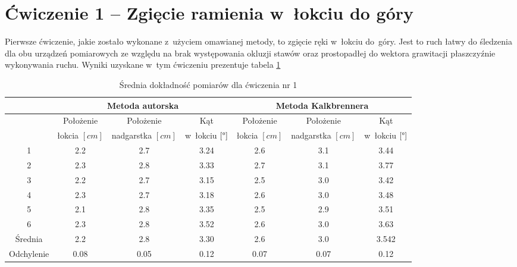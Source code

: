 \section*{Ćwiczenie 1 -- Zgięcie ramienia w~łokciu do góry}
Pierwsze ćwiczenie, jakie zostało wykonane z~użyciem omawianej metody, to zgięcie ręki w~łokciu do~góry. Jest to ruch łatwy do śledzenia dla obu urządzeń pomiarowych ze względu na brak występowania okluzji stawów oraz prostopadłej do wektora grawitacji płaszczyźnie wykonywania ruchu. Wyniki uzyskane w~tym ćwiczeniu prezentuje tabela \ref{tab:experiments:first:avg}
\begin{table}[!htp]
	\caption{Średnia dokładność pomiarów dla ćwiczenia nr 1}
	\label{tab:experiments:first:avg}
	\noindent
	\tiny
	\centering
	\begin{tabular}{|c|c|c|c|c|c|c|}
		\hline 
		& \multicolumn{3}{c|}{Metoda autorska} & \multicolumn{3}{c|}{Metoda Kalkbrennera}  \\ 
		\hline 
		           & Położenie    & Położenie       & Kąt                  & Położenie    & Położenie       & Kąt                  \\
		           & łokcia $[cm]$ & nadgarstka $[cm]$ & w~łokciu	$[\degree]$ & łokcia $[cm]$ & nadgarstka $[cm]$ & w~łokciu	$[\degree]$ \\
		\hline
		1          & 2.2            & 2.7               & 3.24                  & 2.6            & 3.1               & 3.44                  \\
		2          & 2.3            & 2.8               & 3.33                  & 2.7            & 3.1               & 3.77                  \\
		3          & 2.2            & 2.7               & 3.15                  & 2.5            & 3.0               & 3.42                  \\
		4          & 2.3            & 2.7               & 3.18                  & 2.6            & 3.0               & 3.48                  \\
		5          & 2.1            & 2.8               & 3.35                  & 2.5            & 2.9               & 3.51                  \\
		6          & 2.3            & 2.8               & 3.52                  & 2.6            & 3.0               & 3.63                  \\
		\hline
		Średnia    & 2.2            & 2.8               & 3.30                  & 2.6            & 3.0               & 3.542                 \\
		Odchylenie & 0.08           & 0.05              & 0.12                  & 0.07           & 0.07              & 0.12                  \\
		\hline
	\end{tabular} 
	
\end{table} 


